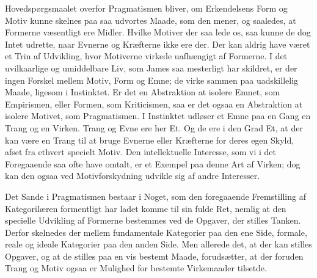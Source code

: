 \documentclass[12pt,a4paper]{book}
\newcommand{\apage}[1]{\marginnote{\footnotesize\textit{[#1]}}}
\begin{document}
Hovedspørgsmaalet overfor Pragmatismen bliver, om Erkendelsens Form og Motiv kunne
skelnes paa saa udvortes Maade, som den mener, og saaledes, at Formerne væsentligt
ere Midler. Hvilke Motiver der saa lede os, saa kunne de dog Intet udrette, naar
Evnerne og Kræfterne ikke ere der. Der kan aldrig have været et Trin af Udvikling,
hvor Motiverne virkede uafhængigt af Formerne. I det uvilkaarlige og umiddelbare
Liv, som James saa mesterligt har skildret, \apage{271} er der ingen Forskel mellem Motiv,
Form og Emne; de virke sammen paa uadskillelig Maade, ligesom i Instinktet. Er det
en Abstraktion at isolere Emnet, som Empirismen, eller Formen, som Kriticismen, saa
er det ogsaa en Abstraktion at isolere Motivet, som Pragmatismen. I Instinktet
udløser et Emne paa en Gang en Trang og en Virken. Trang og Evne ere her Et. Og de
ere i den Grad Et, at der kan være en Trang til at bruge Evnerne eller Kræfterne
for deres egen Skyld, afset fra ethvert specielt Motiv. Den intellektuelle
Interesse, som vi i det Foregaaende saa ofte have omtalt, er et Exempel paa denne
Art af Virken; dog kan den ogsaa ved Motivforskydning udvikle sig af andre
Interesser.

Det Sande i Pragmatismen bestaar i Noget, som den foregaaende Fremstilling af
Kategorilæren formentligt har ladet komme til sin fulde Ret, nemlig at den
specielle Udvikling af Formerne bestemmes ved de Opgaver, der stilles Tanken.
Derfor skelnedes der mellem fundamentale Kategorier paa den ene Side, formale,
reale og ideale Kategorier paa den anden Side. Men allerede det, at der kan stilles
Opgaver, og at de stilles paa en vis bestemt Maade, forudsætter, at der foruden
Trang og Motiv ogsaa er Mulighed for bestemte Virkemaader tilsetde.
\end{document}
